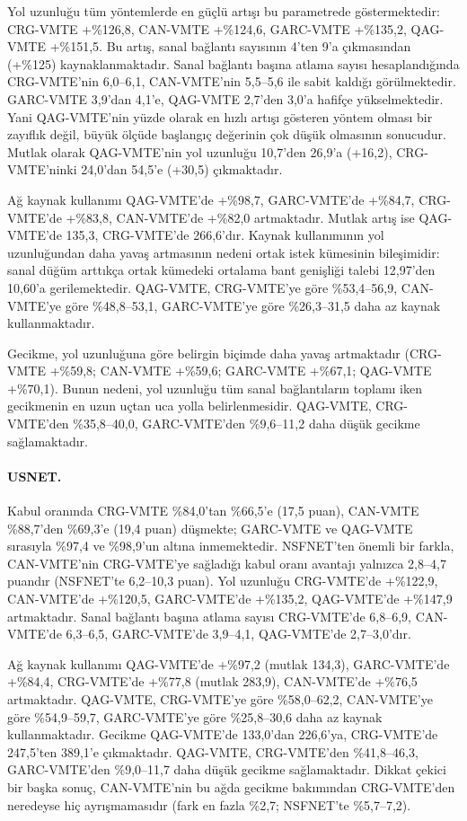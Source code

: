 \documentclass[10pt,twocolumn]{article}
\begin{document}
Yol uzunluğu tüm yöntemlerde en güçlü artışı bu parametrede göstermektedir: CRG-VMTE +\%126,8, CAN-VMTE +\%124,6, GARC-VMTE +\%135,2, QAG-VMTE +\%151,5. Bu artış, sanal bağlantı sayısının 4'ten 9'a çıkmasından (+\%125) kaynaklanmaktadır. Sanal bağlantı başına atlama sayısı hesaplandığında CRG-VMTE'nin 6,0--6,1, CAN-VMTE'nin 5,5--5,6 ile sabit kaldığı görülmektedir. GARC-VMTE 3,9'dan 4,1'e, QAG-VMTE 2,7'den 3,0'a hafifçe yükselmektedir. Yani QAG-VMTE'nin yüzde olarak en hızlı artışı gösteren yöntem olması bir zayıflık değil, büyük ölçüde başlangıç değerinin çok düşük olmasının sonucudur. Mutlak olarak QAG-VMTE'nin yol uzunluğu 10,7'den 26,9'a (+16,2), CRG-VMTE'ninki 24,0'dan 54,5'e (+30,5) çıkmaktadır.

Ağ kaynak kullanımı QAG-VMTE'de +\%98,7, GARC-VMTE'de +\%84,7, CRG-VMTE'de +\%83,8, CAN-VMTE'de +\%82,0 artmaktadır. Mutlak artış ise QAG-VMTE'de 135,3, CRG-VMTE'de 266,6'dır. Kaynak kullanımının yol uzunluğundan daha yavaş artmasının nedeni ortak istek kümesinin bileşimidir: sanal düğüm arttıkça ortak kümedeki ortalama bant genişliği talebi 12,97'den 10,60'a gerilemektedir. QAG-VMTE, CRG-VMTE'ye göre \%53,4--56,9, CAN-VMTE'ye göre \%48,8--53,1, GARC-VMTE'ye göre \%26,3--31,5 daha az kaynak kullanmaktadır.

Gecikme, yol uzunluğuna göre belirgin biçimde daha yavaş artmaktadır (CRG-VMTE +\%59,8; CAN-VMTE +\%59,6; GARC-VMTE +\%67,1; QAG-VMTE +\%70,1). Bunun nedeni, yol uzunluğu tüm sanal bağlantıların toplamı iken gecikmenin en uzun uçtan uca yolla belirlenmesidir. QAG-VMTE, CRG-VMTE'den \%35,8--40,0, GARC-VMTE'den \%9,6--11,2 daha düşük gecikme sağlamaktadır.

\paragraph{USNET.} Kabul oranında CRG-VMTE \%84,0'tan \%66,5'e (17,5 puan), CAN-VMTE \%88,7'den \%69,3'e (19,4 puan) düşmekte; GARC-VMTE ve QAG-VMTE sırasıyla \%97,4 ve \%98,9'un altına inmemektedir. NSFNET'ten önemli bir farkla, CAN-VMTE'nin CRG-VMTE'ye sağladığı kabul oranı avantajı yalnızca 2,8--4,7 puandır (NSFNET'te 6,2--10,3 puan). Yol uzunluğu CRG-VMTE'de +\%122,9, CAN-VMTE'de +\%120,5, GARC-VMTE'de +\%135,2, QAG-VMTE'de +\%147,9 artmaktadır. Sanal bağlantı başına atlama sayısı CRG-VMTE'de 6,8--6,9, CAN-VMTE'de 6,3--6,5, GARC-VMTE'de 3,9--4,1, QAG-VMTE'de 2,7--3,0'dır.

Ağ kaynak kullanımı QAG-VMTE'de +\%97,2 (mutlak 134,3), GARC-VMTE'de +\%84,4, CRG-VMTE'de +\%77,8 (mutlak 283,9), CAN-VMTE'de +\%76,5 artmaktadır. QAG-VMTE, CRG-VMTE'ye göre \%58,0--62,2, CAN-VMTE'ye göre \%54,9--59,7, GARC-VMTE'ye göre \%25,8--30,6 daha az kaynak kullanmaktadır. Gecikme QAG-VMTE'de 133,0'dan 226,6'ya, CRG-VMTE'de 247,5'ten 389,1'e çıkmaktadır. QAG-VMTE, CRG-VMTE'den \%41,8--46,3, GARC-VMTE'den \%9,0--11,7 daha düşük gecikme sağlamaktadır. Dikkat çekici bir başka sonuç, CAN-VMTE'nin bu ağda gecikme bakımından CRG-VMTE'den neredeyse hiç ayrışmamasıdır (fark en fazla \%2,7; NSFNET'te \%5,7--7,2).
\end{document}

